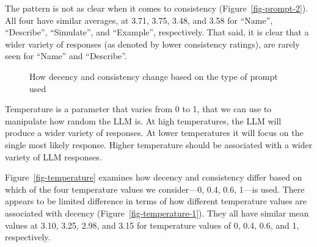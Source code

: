 \documentclass[
  letterpaper,
  DIV=11,
  numbers=noendperiod]{scrartcl}
\begin{document}
The pattern is not as clear when it comes to consistency
(Figure~\ref{fig-prompt-2}). All four have similar averages, at 3.71,
3.75, 3.48, and 3.58 for ``Name'', ``Describe'', ``Simulate'', and
``Example'', respectively. That said, it is clear that a wider variety
of responses (as denoted by lower consistency ratings), are rarely seen
for ``Name'' and ``Describe''.

\begin{figure}

\begin{minipage}[t]{0.50\linewidth}

{\centering 


}

\end{minipage}%
%
\begin{minipage}[t]{0.50\linewidth}

{\centering 


}

\end{minipage}%

\caption{\label{fig-prompt}How decency and consistency change based on
the type of prompt used}

\end{figure}

Temperature is a parameter that varies from 0 to 1, that we can use to
manipulate how random the LLM is. At high temperatures, the LLM will
produce a wider variety of responses. At lower temperatures it will
focus on the single most likely response. Higher temperature should be
associated with a wider variety of LLM responses.

Figure~\ref{fig-temperature} examines how decency and consistency differ
based on which of the four temperature values we consider---0, 0.4, 0.6,
1---is used. There appears to be limited difference in terms of how
different temperature values are associated with decency
(Figure~\ref{fig-temperature-1}). They all have similar mean values at
3.10, 3.25, 2.98, and 3.15 for temperature values of 0, 0.4, 0.6, and 1,
respectively.
\end{document}
